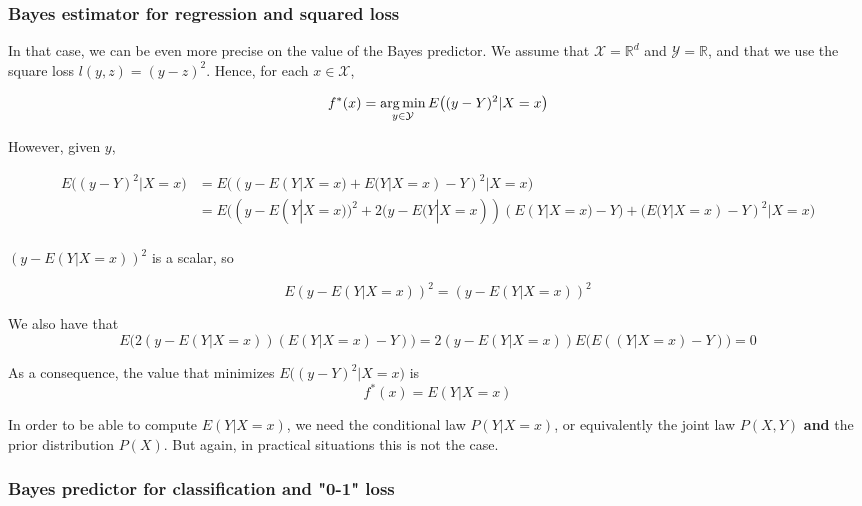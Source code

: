 \documentclass[
10pt, %
a4paper, %
oneside, %
headinclude,footinclude, %
BCOR5mm, %
]{scrartcl}
\begin{document}
    \subsubsection{\large\color{Periwinkle}Bayes estimator for regression and squared loss}

    In that case, we can be even more precise on the value of the Bayes predictor. We assume that $ \mathcal{X} = \mathbb{R}^d$ and $ \mathcal{Y}= \mathbb{R} $, and that we use the square loss $l(y,z)=(y-z)^2$. Hence, for each $x\in \mathcal{X} $,

\begin{equation*}
    f^*(x)= \operatorname*{arg\,min}_{y\in \mathcal{Y} }E\big((y-Y)^2 |X=x\big)
\end{equation*}

However, given $y$,

\begin{equation*}
    \begin{aligned}
	E\big((y-Y)^2 |X=x\big)&= E\big((y-E(Y|X=x)+E(Y|X=x)-Y)^2 |X=x\big)\\
	&=E\big((y-E(Y|X=x))^2+2(y-E(Y|X=x))(E(Y|X=x)-Y)+(E(Y|X=x)-Y)^2 |X=x\big)\\
    \end{aligned}
\end{equation*}

    $(y-E(Y|X=x))^2$  is a scalar, so 

\begin{equation*}
    E(y-E(Y|X=x))^2=(y-E(Y|X=x))^2
\end{equation*}

We also have that
\begin{equation*}
    E\big(2(y-E(Y|X=x))(E(Y|X=x)-Y)\big)=2(y-E(Y|X=x))E\big(E((Y|X=x)-Y)\big)=0
\end{equation*}

As a consequence, the value that minimizes $E\big((y-Y)^2 |X=x\big)$ is
\begin{equation}
    f^*(x)=E(Y|X=x)
\end{equation}

\begin{remark}
    In order to be able to compute $E(Y|X=x)$, we need the conditional law
    $P(Y|X=x)$, or equivalently  the joint law $P(X,Y)$ \textbf{{and}} the prior
    distribution $P(X)$. But again, in practical situations this is not the
    case.
\end{remark}

\subsubsection{\large\color{Periwinkle}Bayes predictor for classification and "0-1" loss}
\end{document}

